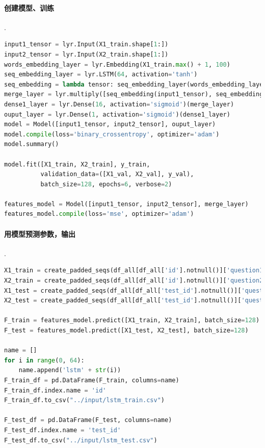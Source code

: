 \documentclass{article}
\begin{document}
\paragraph{创建模型、训练} .

\begin{lstlisting}[language=python]
input1_tensor = lyr.Input(X1_train.shape[1:])
input2_tensor = lyr.Input(X2_train.shape[1:])
words_embedding_layer = lyr.Embedding(X1_train.max() + 1, 100)
seq_embedding_layer = lyr.LSTM(64, activation='tanh')
seq_embedding = lambda tensor: seq_embedding_layer(words_embedding_layer(tensor))
merge_layer = lyr.multiply([seq_embedding(input1_tensor), seq_embedding(input2_tensor)])
dense1_layer = lyr.Dense(16, activation='sigmoid')(merge_layer)
ouput_layer = lyr.Dense(1, activation='sigmoid')(dense1_layer)
model = Model([input1_tensor, input2_tensor], ouput_layer)
model.compile(loss='binary_crossentropy', optimizer='adam')
model.summary()

model.fit([X1_train, X2_train], y_train,
          validation_data=([X1_val, X2_val], y_val),
          batch_size=128, epochs=6, verbose=2)

features_model = Model([input1_tensor, input2_tensor], merge_layer)
features_model.compile(loss='mse', optimizer='adam')
\end{lstlisting}

\paragraph{用模型预测参数，输出} .

\begin{lstlisting}[language=python]
X1_train = create_padded_seqs(df_all[df_all['id'].notnull()]['question1'])
X2_train = create_padded_seqs(df_all[df_all['id'].notnull()]['question2'])
X1_test = create_padded_seqs(df_all[df_all['test_id'].notnull()]['question1'])
X2_test = create_padded_seqs(df_all[df_all['test_id'].notnull()]['question2'])

F_train = features_model.predict([X1_train, X2_train], batch_size=128)
F_test = features_model.predict([X1_test, X2_test], batch_size=128)

name = []
for i in range(0, 64):
    name.append('lstm' + str(i))
F_train_df = pd.DataFrame(F_train, columns=name)
F_train_df.index.name = 'id'
F_train_df.to_csv("../input/lstm_train.csv")

F_test_df = pd.DataFrame(F_test, columns=name)
F_test_df.index.name = 'test_id'
F_test_df.to_csv("../input/lstm_test.csv")
\end{lstlisting}
\end{document}
